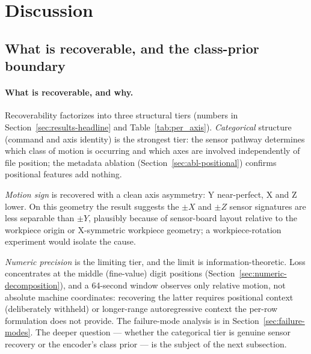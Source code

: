 \documentclass[sensors,article,submit,moreauthors,pdftex]{Definitions/mdpi}
\begin{document}


\section{Discussion}
\label{sec:discussion}

\subsection{What is recoverable, and the class-prior boundary}
\label{sec:disc-deployment}

\paragraph{What is recoverable, and why.}\label{sec:disc-recoverability}\hspace*{0pt plus 1fill}

Recoverability factorizes into three structural tiers (numbers in Section~\ref{sec:results-headline} and Table~\ref{tab:per_axis}). \emph{Categorical} structure (command and axis identity) is the strongest tier: the sensor pathway determines which class of motion is occurring and which axes are involved independently of file position; the metadata ablation (Section~\ref{sec:abl-positional}) confirms positional features add nothing.

\emph{Motion sign} is recovered with a clean axis asymmetry: Y near-perfect, X and Z lower. On this geometry the result suggests the $\pm X$ and $\pm Z$ sensor signatures are less separable than $\pm Y$, plausibly because of sensor-board layout relative to the workpiece origin or X-symmetric workpiece geometry; a workpiece-rotation experiment would isolate the cause.

\emph{Numeric precision} is the limiting tier, and the limit is information-theoretic. Loss concentrates at the middle (fine-value) digit positions (Section~\ref{sec:numeric-decomposition}), and a 64-second window observes only relative motion, not absolute machine coordinates: recovering the latter requires positional context (deliberately withheld) or longer-range autoregressive context the per-row formulation does not provide. The failure-mode analysis is in Section~\ref{sec:failure-modes}. The deeper question --- whether the categorical tier is genuine sensor recovery or the encoder's class prior --- is the subject of the next subsection.\label{sec:disc-failure-mode}
\end{document}
